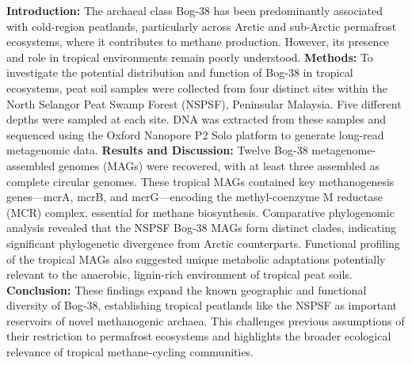 \footnotesize

{

\textbf{Introduction:} The archaeal class Bog-38 has been predominantly associated with cold-region peatlands, particularly across Arctic and sub-Arctic permafrost ecosystems, where it contributes to methane production. However, its presence and role in tropical environments remain poorly understood. \textbf{Methods:} To investigate the potential distribution and function of Bog-38 in tropical ecosystems, peat soil samples were collected from four distinct sites within the North Selangor Peat Swamp Forest (NSPSF), Peninsular Malaysia. Five different depths were sampled at each site. DNA was extracted from these samples and sequenced using the Oxford Nanopore P2 Solo platform to generate long-read metagenomic data. \textbf{Results and Discussion:} Twelve Bog-38 metagenome-assembled genomes (MAGs) were recovered, with at least three assembled as complete circular genomes. These tropical MAGs contained key methanogenesis genes—mcrA, mcrB, and mcrG—encoding the methyl-coenzyme M reductase (MCR) complex, essential for methane biosynthesis. Comparative phylogenomic analysis revealed that the NSPSF Bog-38 MAGs form distinct clades, indicating significant phylogenetic divergence from Arctic counterparts. Functional profiling of the tropical MAGs also suggested unique metabolic adaptations potentially relevant to the anaerobic, lignin-rich environment of tropical peat soils. \textbf{Conclusion:} These findings expand the known geographic and functional diversity of Bog-38, establishing tropical peatlands like the NSPSF as important reservoirs of novel methanogenic archaea. This challenges previous assumptions of their restriction to permafrost ecosystems and highlights the broader ecological relevance of tropical methane-cycling communities.
}